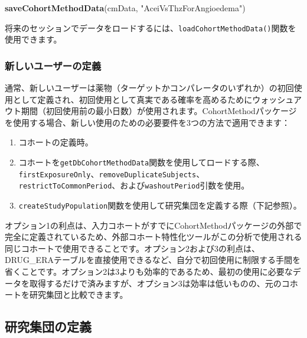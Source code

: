 \documentclass[
  11pt]{book}
\newenvironment{Shaded}{\begin{snugshade}}{\end{snugshade}}
\newcommand{\FunctionTok}[1]{\textcolor[rgb]{0.13,0.29,0.53}{\textbf{#1}}}
\newcommand{\NormalTok}[1]{#1}
\newcommand{\StringTok}[1]{\textcolor[rgb]{0.31,0.60,0.02}{#1}}
\providecommand{\tightlist}{%
  \setlength{\itemsep}{0pt}\setlength{\parskip}{0pt}}
\theoremstyle{definition}
\theoremstyle{definition}
\theoremstyle{definition}
\theoremstyle{definition}
\theoremstyle{remark}
\begin{document}
\begin{Shaded}
\begin{Highlighting}[]
\FunctionTok{saveCohortMethodData}\NormalTok{(cmData, }\StringTok{"AceiVsThzForAngioedema"}\NormalTok{)}
\end{Highlighting}
\end{Shaded}

将来のセッションでデータをロードするには、\texttt{loadCohortMethodData()}関数を使用できます。

\subsubsection*{新しいユーザーの定義}\label{ux65b0ux3057ux3044ux30e6ux30fcux30b6ux30fcux306eux5b9aux7fa9}

通常、新しいユーザーは薬物（ターゲットかコンパレータのいずれか）の初回使用として定義され、初回使用として真実である確率を高めるためにウォッシュアウト期間（初回使用前の最小日数）が使用されます。CohortMethodパッケージを使用する場合、新しい使用のための必要要件を3つの方法で適用できます：

\begin{enumerate}
\def\labelenumi{\arabic{enumi}.}
\tightlist
\item
  コホートの定義時。
\item
  コホートを\texttt{getDbCohortMethodData}関数を使用してロードする際、\texttt{firstExposureOnly}、\texttt{removeDuplicateSubjects}、\texttt{restrictToCommonPeriod}、および\texttt{washoutPeriod}引数を使用。
\item
  \texttt{createStudyPopulation}関数を使用して研究集団を定義する際（下記参照）。
\end{enumerate}

オプション1の利点は、入力コホートがすでにCohortMethodパッケージの外部で完全に定義されているため、外部コホート特性化ツールがこの分析で使用される同じコホートで使用できることです。オプション2および3の利点は、DRUG\_ERAテーブルを直接使用できるなど、自分で初回使用に制限する手間を省くことです。オプション2は3よりも効率的であるため、最初の使用に必要なデータを取得するだけで済みますが、オプション3は効率は低いものの、元のコホートを研究集団と比較できます。

\subsection{研究集団の定義}\label{ux7814ux7a76ux96c6ux56e3ux306eux5b9aux7fa9}
\end{document}
